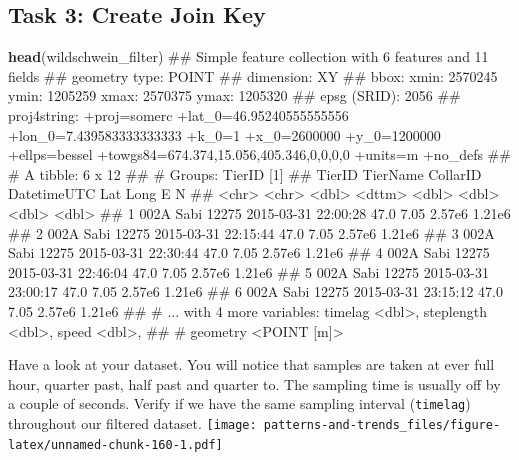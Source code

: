 \documentclass[]{book}
\newenvironment{Shaded}{\begin{snugshade}}{\end{snugshade}}
\newcommand{\KeywordTok}[1]{\textcolor[rgb]{0.13,0.29,0.53}{\textbf{#1}}}
\newcommand{\StringTok}[1]{\textcolor[rgb]{0.31,0.60,0.02}{#1}}
\newcommand{\OperatorTok}[1]{\textcolor[rgb]{0.81,0.36,0.00}{\textbf{#1}}}
\newcommand{\NormalTok}[1]{#1}
\begin{document}
\begin{Shaded}
\end{Shaded}

\subsection{Task 3: Create Join Key}\label{task-3-create-join-key}

\begin{Shaded}
\begin{Highlighting}[]
\KeywordTok{head}\NormalTok{(wildschwein_filter)}
\NormalTok{## Simple feature collection with 6 features and 11 fields}
\NormalTok{## geometry type:  POINT}
\NormalTok{## dimension:      XY}
\NormalTok{## bbox:           xmin: 2570245 ymin: 1205259 xmax: 2570375 ymax: 1205320}
\NormalTok{## epsg (SRID):    2056}
\NormalTok{## proj4string:    +proj=somerc +lat_0=46.95240555555556 +lon_0=7.439583333333333 +k_0=1 +x_0=2600000 +y_0=1200000 +ellps=bessel +towgs84=674.374,15.056,405.346,0,0,0,0 +units=m +no_defs}
\NormalTok{## # A tibble: 6 x 12}
\NormalTok{## # Groups:   TierID [1]}
\NormalTok{##   TierID TierName CollarID DatetimeUTC           Lat  Long      E      N}
\NormalTok{##   <chr>  <chr>       <dbl> <dttm>              <dbl> <dbl>  <dbl>  <dbl>}
\NormalTok{## 1 002A   Sabi        12275 2015-03-31 22:00:28  47.0  7.05 2.57e6 1.21e6}
\NormalTok{## 2 002A   Sabi        12275 2015-03-31 22:15:44  47.0  7.05 2.57e6 1.21e6}
\NormalTok{## 3 002A   Sabi        12275 2015-03-31 22:30:44  47.0  7.05 2.57e6 1.21e6}
\NormalTok{## 4 002A   Sabi        12275 2015-03-31 22:46:04  47.0  7.05 2.57e6 1.21e6}
\NormalTok{## 5 002A   Sabi        12275 2015-03-31 23:00:17  47.0  7.05 2.57e6 1.21e6}
\NormalTok{## 6 002A   Sabi        12275 2015-03-31 23:15:12  47.0  7.05 2.57e6 1.21e6}
\NormalTok{## # ... with 4 more variables: timelag <dbl>, steplength <dbl>, speed <dbl>,}
\NormalTok{## #   geometry <POINT [m]>}
\end{Highlighting}
\end{Shaded}

Have a look at your dataset. You will notice that samples are taken at
ever full hour, quarter past, half past and quarter to. The sampling
time is usually off by a couple of seconds. Verify if we have the same
sampling interval (\texttt{timelag}) throughout our filtered dataset.
\texttt{[image: patterns-and-trends\_files/figure-latex/unnamed-chunk-160-1.pdf]}
\end{document}
